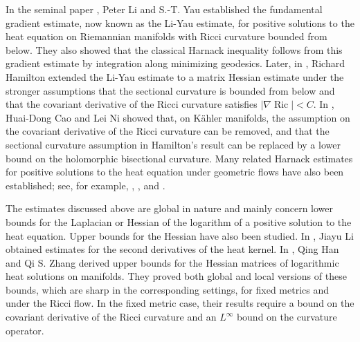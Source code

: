 \documentclass{amsart}
\theoremstyle{definition}
\theoremstyle{remark}
\numberwithin{equation}{section}
\begin{document}
In the seminal paper \cite{Li-Yau}, Peter Li and S.-T. Yau established the fundamental gradient estimate, now known as the Li-Yau estimate, for positive solutions to the heat equation on Riemannian manifolds with Ricci curvature bounded from below. They also showed that the classical Harnack inequality follows from this gradient estimate by integration along minimizing geodesics. Later, in \cite{Hamilton}, Richard Hamilton extended the Li-Yau estimate to a matrix Hessian estimate under the stronger assumptions that the sectional curvature is bounded from below and that the covariant derivative of the Ricci curvature satisfies $|\nabla \operatorname{Ric}|<C$. In \cite{Cao-Ni}, Huai-Dong Cao and Lei Ni showed that, on K\"ahler manifolds, the assumption on the covariant derivative of the Ricci curvature can be removed, and that the sectional curvature assumption in Hamilton's result can be replaced by a lower bound on the holomorphic bisectional curvature. Many related Harnack estimates for positive solutions to the heat equation under geometric flows have also been established; see, for example, \cite{CaoXD}, \cite{Cao-Hamilton}, and \cite{Li-Zhang}.

The estimates discussed above are global in nature and mainly concern lower bounds for the Laplacian or Hessian of the logarithm of a positive solution to the heat equation. Upper bounds for the Hessian have also been studied. In \cite{Lijiayu}, Jiayu Li obtained estimates for the second derivatives of the heat kernel. In \cite{Han-Zhang}, Qing Han and Qi S. Zhang derived upper bounds for the Hessian matrices of logarithmic heat solutions on manifolds. They proved both global and local versions of these bounds, which are sharp in the corresponding settings, for fixed metrics and under the Ricci flow. In the fixed metric case, their results require a bound on the covariant derivative of the Ricci curvature and an $L^{\infty}$ bound on the curvature operator.
\end{document}
